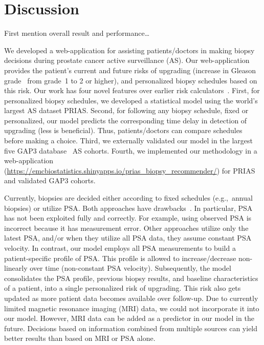 \section{Discussion}
First mention overall result and performance… 

We developed a web-application for assisting patients/doctors in making biopsy decisions during prostate cancer active surveillance (AS). Our web-application provides the patient's current and future risks of upgrading (increase in Gleason grade~\citep{epsteinGG2014} from grade~1 to 2 or higher), and personalized biopsy schedules based on this risk. Our work has four novel features over earlier risk calculators~\citep{coley2017prediction,ankerst2015precision}. First, for personalized biopsy schedules, we developed a statistical model using the world's largest AS dataset PRIAS. Second, for following any biopsy schedule, fixed or personalized, our model predicts the corresponding time delay in detection of upgrading (less is beneficial). Thus, patients/doctors can compare schedules before making a choice. Third, we externally validated our model in the largest five GAP3 database~\citep{gap3_2018} AS cohorts. Fourth, we implemented our methodology in a web-application (\url{https://emcbiostatistics.shinyapps.io/prias_biopsy_recommender/}) for PRIAS and validated GAP3 cohorts.

Currently, biopsies are decided either according to fixed schedules (e.g.,~annual biopsies) or utilize PSA. Both approaches have drawbacks~\citep{vickers2009psavelocity,bokhorst2015compliance}. In particular, PSA has not been exploited fully and correctly. For example, using observed PSA is incorrect because it has measurement error. Other approaches utilize only the latest PSA, and/or when they utilize all PSA data, they assume constant PSA velocity. In contrast, our model employs all PSA measurements to build a patient-specific profile of PSA. This profile is allowed to increase/decrease non-linearly over time (non-constant PSA velocity). Subsequently, the model consolidates the PSA profile, previous biopsy results, and baseline characteristics of a patient, into a single personalized risk of upgrading. This risk also gets updated as more patient data becomes available over follow-up. Due to currently limited magnetic resonance imaging (MRI) data, we could not incorporate it into our model. However, MRI data can be added as a predictor in our model in the future. Decisions based on information combined from multiple sources can yield better results than based on MRI or PSA alone. 

